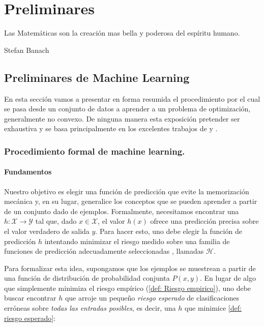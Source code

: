 \chapter{Preliminares}\label{ch:preliminares}

\epigraph{Las Matem\'aticas son la creaci\'on mas bella y poderosa del esp\'iritu humano.}{Stefan Banach}

\section{Preliminares de Machine Learning}

En esta secci\'on vamos a presentar en forma resumida el procedimiento por el cual se pasa desde un conjunto de datos a aprender a un problema de optimizaci\'on, generalmente no convexo. De ninguna manera esta exposici\'on pretender ser exhaustiva y se basa principalmente en los excelentes trabajos de \cite{bottou:2016} y \cite{mohri:2012}.

\subsection{Procedimiento formal de machine learning.}

\subsubsection{Fundamentos} 
Nuestro objetivo es elegir una funci\'on de predicci\'on que evite la memorizaci\'on mec\'anica y, en su lugar, generalice los conceptos que se pueden aprender a partir de un conjunto dado de ejemplos. Formalmente, necesitamos encontrar una $h:\mathcal{X} \rightarrow \mathcal{Y}$ tal que, dado $x \in \mathcal{X}$, el valor $h (x)$ ofrece una predicci\'on precisa sobre el valor verdadero de salida $y$. Para hacer esto, uno debe elegir la funci\'on de predicci\'on $h$ intentando minimizar el riesgo medido sobre una familia de funciones de predicci\'on adecuadamente seleccionadas \cite{vapnik:1971}, llamadas $\mathcal{H}$.

Para formalizar esta idea, supongamos que los ejemplos se muestrean a partir de una funci\'on de distribuci\'on de probabilidad conjunta $P (x, y)$. En lugar de algo que simplemente minimiza el riesgo emp\'irico (\ref{def: Riesgo empirico}), uno debe buscar encontrar $h$ que arroje un peque\~no \textit{riesgo esperado} de clasificaciones err\'oneas sobre \textit{todas las entradas posibles}, es decir, una $h$ que minimice \ref{def: riesgo esperado}:

